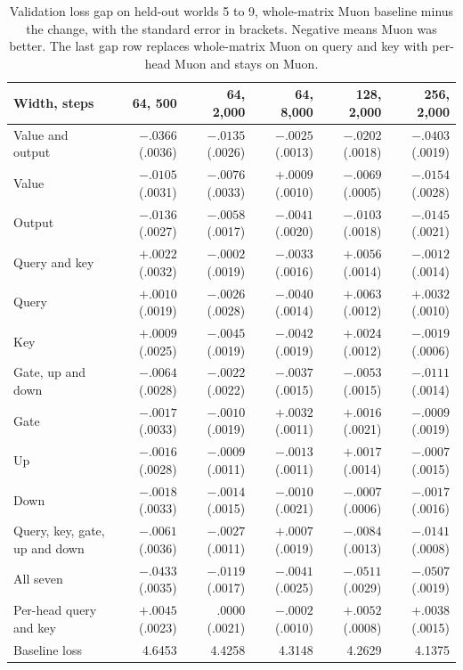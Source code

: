 \documentclass[11pt]{article}
\begin{document}
\begin{table}[t]
\centering
\small
\begin{tabular}{lrrrrr}
\toprule
Width, steps & 64, 500 & 64, 2{,}000 & 64, 8{,}000 & 128, 2{,}000 & 256, 2{,}000 \\
\midrule
Value and output & $-.0366$ (.0036) & $-.0135$ (.0026) & $-.0025$ (.0013) & $-.0202$ (.0018) & $-.0403$ (.0019) \\
Value & $-.0105$ (.0031) & $-.0076$ (.0033) & $+.0009$ (.0010) & $-.0069$ (.0005) & $-.0154$ (.0028) \\
Output & $-.0136$ (.0027) & $-.0058$ (.0017) & $-.0041$ (.0020) & $-.0103$ (.0018) & $-.0145$ (.0021) \\
Query and key & $+.0022$ (.0032) & $-.0002$ (.0019) & $-.0033$ (.0016) & $+.0056$ (.0014) & $-.0012$ (.0014) \\
Query & $+.0010$ (.0019) & $-.0026$ (.0028) & $-.0040$ (.0014) & $+.0063$ (.0012) & $+.0032$ (.0010) \\
Key & $+.0009$ (.0025) & $-.0045$ (.0019) & $-.0042$ (.0019) & $+.0024$ (.0012) & $-.0019$ (.0006) \\
Gate, up and down & $-.0064$ (.0028) & $-.0022$ (.0022) & $-.0037$ (.0015) & $-.0053$ (.0015) & $-.0111$ (.0014) \\
Gate & $-.0017$ (.0033) & $-.0010$ (.0019) & $+.0032$ (.0011) & $+.0016$ (.0021) & $-.0009$ (.0019) \\
Up & $-.0016$ (.0028) & $-.0009$ (.0011) & $-.0013$ (.0011) & $+.0017$ (.0014) & $-.0007$ (.0015) \\
Down & $-.0018$ (.0033) & $-.0014$ (.0015) & $-.0010$ (.0021) & $-.0007$ (.0006) & $-.0017$ (.0016) \\
Query, key, gate, up and down & $-.0061$ (.0036) & $-.0027$ (.0011) & $+.0007$ (.0019) & $-.0084$ (.0013) & $-.0141$ (.0008) \\
All seven & $-.0433$ (.0035) & $-.0119$ (.0017) & $-.0041$ (.0025) & $-.0511$ (.0029) & $-.0507$ (.0019) \\
Per-head query and key & $+.0045$ (.0023) & $.0000$ (.0021) & $-.0002$ (.0010) & $+.0052$ (.0008) & $+.0038$ (.0015) \\
\midrule
Baseline loss & 4.6453 & 4.4258 & 4.3148 & 4.2629 & 4.1375 \\
\bottomrule
\end{tabular}
\caption{Validation loss gap on held-out worlds 5 to 9, whole-matrix Muon baseline minus the change, with the standard error in brackets. Negative means Muon was better. The last gap row replaces whole-matrix Muon on query and key with per-head Muon and stays on Muon.}
\label{tab:map}
\end{table}
\end{document}
